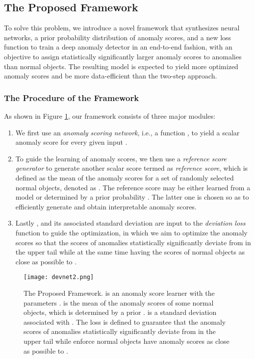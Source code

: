 \documentclass[sigconf]{acmart}
\begin{document}
\subsection{The Proposed Framework}

To solve this problem, we introduce a novel framework that synthesizes neural networks, a prior probability distribution of anomaly scores, and a new loss function to train a deep anomaly detector in an end-to-end fashion, with an objective to assign statistically significantly larger anomaly scores to anomalies than normal objects. The resulting model is expected to yield more optimized anomaly scores and be more data-efficient than the two-step approach. 

\subsubsection{The Procedure of the Framework}
As shown in Figure \ref{fig:framework}, our framework consists of three major modules: 
\begin{enumerate}
    \item We first use an \textit{anomaly scoring network}, i.e., a function , to yield a scalar anomaly score for every given input .
    \item To guide the learning of anomaly scores, we then use a \textit{reference score generator} to generate another scalar score termed as \textit{reference score}, which is defined as the mean of the anomaly scores  for a set of  randomly selected normal objects, denoted as . The reference score  may be either learned from a model or determined by a prior probability . The latter one is chosen so as to efficiently generate  and obtain interpretable anomaly scores. 
    \item Lastly ,  and its associated standard deviation  are input to the \textit{deviation loss} function  to guide the optimization, in which we aim to optimize the anomaly scores so that the scores of anomalies statistically significantly deviate from  in the upper tail while at the same time having the scores of normal objects as close as possible to .
\end{enumerate}
 
\begin{figure}[h!]
  \centering
    \texttt{[image: devnet2.png]}
  \caption{The Proposed Framework.  is an anomaly score learner with the parameters .  is the mean of the anomaly scores of some normal objects, which is determined by a prior .  is a standard deviation associated with . The loss  is defined to guarantee that the anomaly scores of anomalies statistically significantly deviate from  in the upper tail while enforce normal objects have anomaly scores as close as possible to . }
  \label{fig:framework}
\end{figure}
\end{document}
